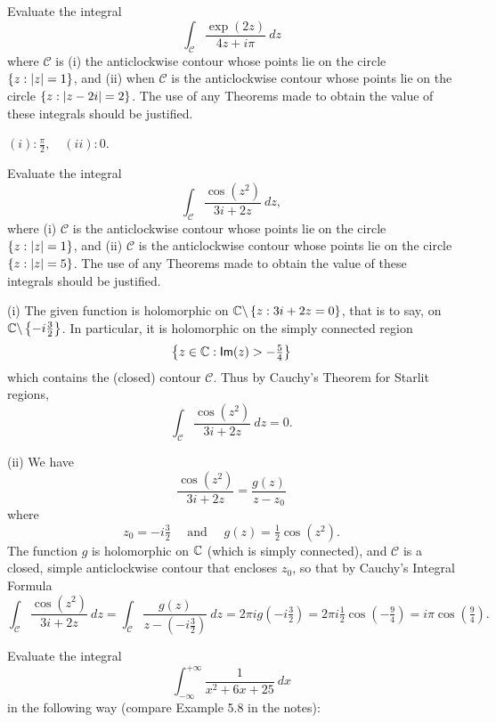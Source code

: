 \begin{questions}
\question Evaluate the integral
\[
\int_{\mathcal{C}} \frac{\exp (2z)}{4z+i\pi}\ dz
\]
where $\mathcal{C}$ is (i) the anticlockwise contour whose points lie on the circle $\left\{z:\left| z \right|=1\right\}$, and (ii) when $\mathcal{C}$ is the anticlockwise contour whose points lie on the circle $\left\{z: \left| z-2i \right|=2\right\}$. The use of any Theorems made to obtain the value of these integrals should be justified.
\begin{answer}
$(i): \frac{\pi}{2},\quad (ii): 0 $.
\end{answer}
\question Evaluate the integral
\[
\int_{\mathcal{C}} \frac{\cos (z^2)}{3i+2z}\ dz,
\]
where (i) $\mathcal{C}$ is the anticlockwise contour whose points lie on the circle $\left\{z:\left| z \right|=1\right\}$, and (ii) $\mathcal{C}$ is the anticlockwise contour whose points lie on the circle $\left\{z: \left| z \right|=5\right\}$.  The use of any Theorems made to obtain the value of these integrals should be justified.
\begin{answer}
(i) The given function is holomorphic on $\mathbb{C} \backslash \left\{ z: 3i+2z=0 \right\}$, that is to say, on $\mathbb{C} \backslash \left\{ -i \frac{3}{2}\right\}$.  In particular, it is holomorphic on the simply connected region 
\[
\left\{ z \in \mathbb{C}: \textsf{Im} (z) > - \tfrac{5}{4} \right\}
\]
which contains the (closed) contour $\mathcal{C}$.  Thus by Cauchy's Theorem for Starlit regions, 
\[
\int_{\mathcal{C}} \frac{\cos (z^2)}{3i+2z}\ dz=0.
\]

(ii) We have
\[
\frac{\cos(z^2)}{3i+2z} = \frac{g(z)}{z-z_0}
\]
where
\[
z_0 = -i \tfrac{3}{2} \quad \text{ and } \quad g(z) = \tfrac{1}{2} \cos (z^2).
\]
The function $g$ is holomorphic on $\mathbb{C}$ (which is simply connected), and $\mathcal{C}$ is a closed, simple anticlockwise contour that encloses $z_0$, so that by Cauchy's Integral Formula
\[
\int_{\mathcal{C}} \frac{\cos(z^2)}{3i+2z}\ dz = \int_{\mathcal{C}} \frac{g(z)}{z-(-i\frac{3}{2})}\ dz = 2\pi i g(-i \tfrac{3}{2}) = 2\pi i \tfrac{1}{2} \cos (- \tfrac{9}{4}) = i \pi \cos ( \tfrac{9}{4} ).
\]

\end{answer}

\question Evaluate the integral
\[
\int_{-\infty}^{+\infty} \frac{1}{x^2+6x+25}\ dx
\]
in the following way (compare Example 5.8 in the notes):
\end{questions}
